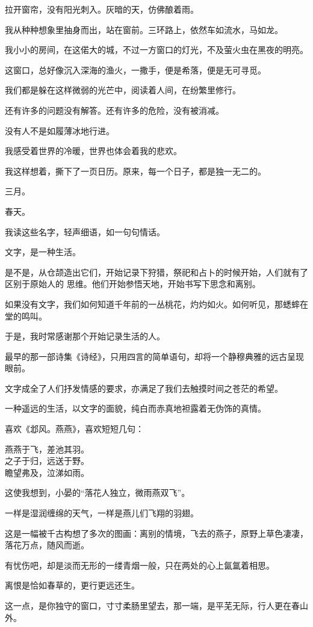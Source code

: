 		\vspace{1em}
		拉开窗帘，没有阳光刺入。灰暗的天，仿佛酿着雨。\par
		我从种种想象里抽身而出，站在窗前。三环路上，依然车如流水，马如龙。\par
		我小小的房间，在这偌大的城，不过一方窗口的灯光，不及萤火虫在黑夜的明亮。\par
		这窗口，总好像沉入深海的渔火，一撒手，便是希落，便是无可寻觅。\par
		我们都是躲在这样微弱的光芒中，阅读着人间，在纷繁里修行。\par
		还有许多的问题没有解答。还有许多的危险，没有被消减。\par
		没有人不是如履薄冰地行进。\par
		我感受着世界的冷暖，世界也体会着我的悲欢。\par
		我这样想着，撕下了一页日历。原来，每一个日子，都是独一无二的。\par
		三月。\par
		春天。\par
		我读这些名字，轻声细语，如一句句情话。

	\endwriting



		文字，是一种生活。

		是不是，从仓颉造出它们，开始记录下狩猎，祭祀和占卜的时候开始，人们就有了区别于原始人的
	思维。他们开始参悟天地，开始书写下思念和离别。

		如果没有文字，我们如何知道千年前的一丛桃花，灼灼如火。如何听见，那蟋蟀在堂的鸣叫。\par
		于是，我时常感谢那个开始记录生活的人。\par
		最早的那一部诗集《诗经》，只用四言的简单语句，却将一个静穆典雅的远古呈现眼前。

		文字成全了人们抒发情感的要求，亦满足了我们去触摸时间之苍茫的希望。\par
		一种遥远的生活，以文字的面貌，纯白而赤真地袒露着无伪饰的真情。

		喜欢《邶风。燕燕》，喜欢短短几句：

		\shortpoem{}{}{}
			燕燕于飞，差池其羽。\\
			之子于归，远送于野。\\
			瞻望弗及，泣涕如雨。\\
		\endshortpoem

		这使我想到，小晏的“落花人独立，微雨燕双飞”。\par
		一样是湿润缠绵的天气，一样是燕儿们飞翔的羽翅。\par
		这是一幅被千古构想了多次的图画：离别的情境，飞去的燕子，原野上草色凄凄，落花万点，随风而逝。\par
		有忧伤吧，却是淡而无形的一缕青烟一般，只在两处的心上氤氲着相思。\par
		离恨是恰如春草的，更行更远还生。\par
		这一点，是你独守的窗口，寸寸柔肠里望去，那一端，是平芜无际，行人更在春山外。

